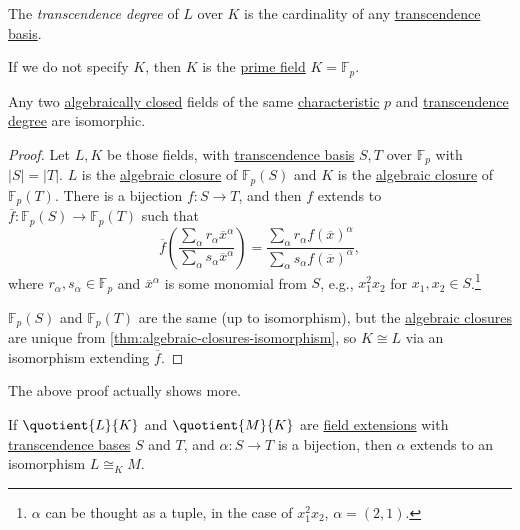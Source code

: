 \begin{definition}\label{def:transcendence-degree}
	The \emph{transcendence degree} of \(L\) over \(K\) is the cardinality of any \hyperref[def:transcendence-basis]{transcendence basis}.
\end{definition}

If we do not specify \(K\), then \(K\) is the \hyperref[def:prime-field]{prime field} \(K = \mathbb{F} _p\).

\begin{theorem}\label{thm:same-transcendence-degree-isomorphic}
	Any two \hyperref[def:algebraically-closed]{algebraically closed} fields of the same \hyperref[def:characteristic]{characteristic} \(p\) and \hyperref[def:transcendence-degree]{transcendence degree} are isomorphic.
\end{theorem}
\begin{proof}
	Let \(L, K\) be those fields, with \hyperref[def:transcendence-basis]{transcendence basis} \(S, T\) over \(\mathbb{F} _p\) with \(\vert S \vert = \vert T \vert \). \(L\) is the \hyperref[def:algebraic-closure]{algebraic closure} of \(\mathbb{F} _p(S)\) and \(K\) is the \hyperref[def:algebraic-closure]{algebraic closure} of \(\mathbb{F} _p(T)\). There is a bijection \(f\colon S\to T\), and then \(f\) extends to \(\overline{f} \colon \mathbb{F} _p(S) \to \mathbb{F} _p(T)\) such that
	\[
		\overline{f} \left( \frac{\sum_{\alpha } r_\alpha \overline{x} ^\alpha }{\sum_{\alpha }s_\alpha \overline{x} ^\alpha  } \right)
		= \frac{\sum_{\alpha } r_\alpha f(\overline{x} )^\alpha }{\sum_{\alpha } s_\alpha f(\overline{x} )^\alpha },
	\]
	where \(r_\alpha , s_\alpha \in \mathbb{F} _p\) and \(\overline{x} ^\alpha \) is some monomial from \(S\), e.g., \(x_1^2 x_2\) for \(x_1, x_2\in S\).\footnote{\(\alpha \) can be thought as a tuple, in the case of \(x_1^2 x_2\), \(\alpha = (2, 1)\).}

	\(\mathbb{F} _p(S)\) and \(\mathbb{F} _p(T)\) are the same (up to isomorphism), but the \hyperref[def:algebraic-closure]{algebraic closures} are unique from \autoref{thm:algebraic-closures-isomorphism}, so \(K \cong L\) via an isomorphism extending \(\overline{f} \).
\end{proof}

The above proof actually shows more.

\begin{corollary}
	If \(\quotient{L}{K} \) and \(\quotient{M}{K} \) are \hyperref[def:field-extension]{field extensions} with \hyperref[def:transcendence-basis]{transcendence bases} \(S\) and \(T\), and \(\alpha \colon S \to T\) is a bijection, then \(\alpha \) extends to an isomorphism \(L \cong _K M\).
\end{corollary}

